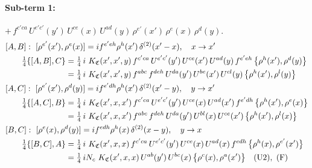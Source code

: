 \documentclass[10pt]{article}
\numberwithin{equation}{section}
\begin{document}
\paragraph{Sub-term 1:} $+\,f^{c'ca}\,U^{e'c'}(y')\,U^{ce}(x)\,U^{ad}(y)\,\rho^{e'}(x')\,\rho^{e}(x)\,\rho^{d}(y)$.
\begin{align}
&[A,B]:\ [\rho^{e'}(x'),\rho^{e}(x)]=i f^{e'eh}\rho^{h}(x')\,\delta^{(2)}(x'-x),\quad x\to x'\notag\\
&\qquad \tfrac14\{[A,B],C\}=\tfrac14\,i\,\,K_{\mathfrak C}(x',x',y)\,f^{c'ca}\,U^{e'c'}(y')\,U^{ce}(x')\,U^{ad}(y)\,f^{e'eh}\,\big\{\rho^{h}(x'),\rho^{d}(y)\big\}\notag\\
&\qquad\phantom{\tfrac14\{[A,B],C\}}=\tfrac14\,i\,\,K_{\mathfrak C}(x',x',y)\,f^{abc}\,f^{deh}\,U^{da}(y')\,U^{be}(x')\,U^{cl}(y)\,\big\{\rho^{h}(x'),\rho^{l}(y)\big\}
\label{eq:GIII.V-1-AB}\\
&[A,C]:\ [\rho^{e'}(x'),\rho^{d}(y)]=i f^{e'dh}\rho^{h}(x')\,\delta^{(2)}(x'-y),\quad y\to x'\notag\\
&\qquad \tfrac14\{[A,C],B\}=\tfrac14\,i\,\,K_{\mathfrak C}(x',x,x')\,f^{c'ca}\,U^{e'c'}(y')\,U^{ce}(x)\,U^{ad}(x')\,f^{e'dh}\,\big\{\rho^{h}(x'),\rho^{e}(x)\big\}\notag\\
&\qquad\phantom{\tfrac14\{[A,C],B\}}=\tfrac14\,i\,\,K_{\mathfrak C}(x',x,x')\,f^{abc}\,f^{deh}\,U^{da}(y')\,U^{bl}(x)\,U^{ce}(x')\,\big\{\rho^{h}(x'),\rho^{l}(x)\big\}
\label{eq:GIII.V-1-AC}\\
&[B,C]:\ [\rho^{e}(x),\rho^{d}(y)]=i f^{edh}\rho^{h}(x)\,\delta^{(2)}(x-y),\quad y\to x\notag\\
&\qquad \tfrac14\{[B,C],A\}=\tfrac14\,i\,\,K_{\mathfrak C}(x',x,x)\,f^{c'ca}\,U^{e'c'}(y')\,U^{ce}(x)\,U^{ad}(x)\,f^{edh}\,\big\{\rho^{h}(x),\rho^{e'}(x')\big\}\notag\\
&\qquad\phantom{\tfrac14\{[B,C],A\}}=\tfrac14\,i N_{c}\,\,K_{\mathfrak C}(x',x,x)\,U^{ab}(y')\,U^{bc}(x)\,\big\{\rho^{c}(x),\rho^{a}(x')\big\}\quad\text{(U2)},\ \text{(F)}
\label{eq:GIII.V-1-BC}
\end{align}
\end{document}
